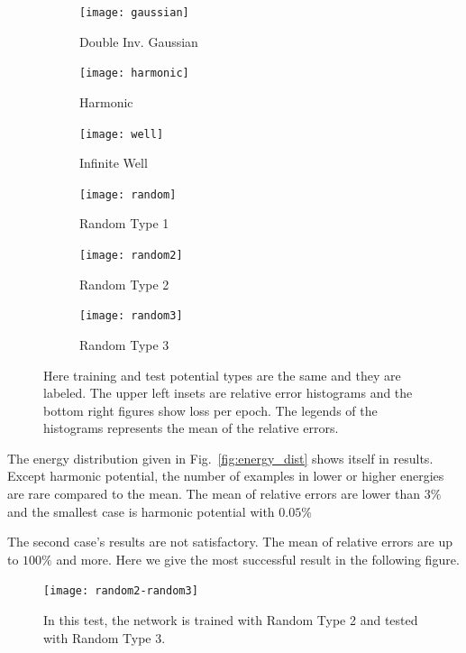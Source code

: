 \documentclass[a4paper,times,hidelinks,12pt]{article}
\begin{document}
\graphicspath{{"../figs/training/"}}
\begin{figure}[H]
    \centering
    \begin{subfigure}[t]{0.49\textwidth}
        \texttt{[image: gaussian]}
    \caption{Double Inv. Gaussian}
    \end{subfigure}
    \begin{subfigure}[t]{0.49\textwidth}
        \texttt{[image: harmonic]}
    \caption{Harmonic}
    \end{subfigure}
    \begin{subfigure}[t]{0.49\textwidth}
        \texttt{[image: well]}
        \caption{Infinite Well}
    \end{subfigure}
    \begin{subfigure}[t]{0.49\textwidth}
        \texttt{[image: random]}
        \caption{Random Type 1}
    \end{subfigure}
    \begin{subfigure}[t]{0.49\textwidth}
        \texttt{[image: random2]}
        \caption{Random Type 2}
    \end{subfigure}
    \begin{subfigure}[t]{0.49\textwidth}
        \texttt{[image: random3]}
        \caption{Random Type 3}
    \end{subfigure}
\caption{Here training and test potential types are the same and they are labeled. The upper left insets are relative error histograms and the bottom right figures show loss per epoch. The legends of the histograms represents the mean of the relative errors.}
\label{fig:training_results}
\end{figure}

The energy distribution given in Fig.~\ref{fig:energy_dist} shows itself in results. Except harmonic potential, the number of examples in lower or higher energies are rare compared to the mean. The mean of relative errors are lower than $3\%$ and the smallest case is harmonic potential with $0.05\%$

The second case's results are not satisfactory. The mean of relative errors are up to $100\%$ and more. Here we give the most successful result in the following figure. 

\graphicspath{{"../figs/training/cross-training/"}}
\begin{figure}[H]
    \centering
    \texttt{[image: random2-random3]}
\caption{In this test, the network is trained with Random Type 2 and tested with Random Type 3.}
\label{fig:cross_training_results}
\end{figure}
\end{document}
